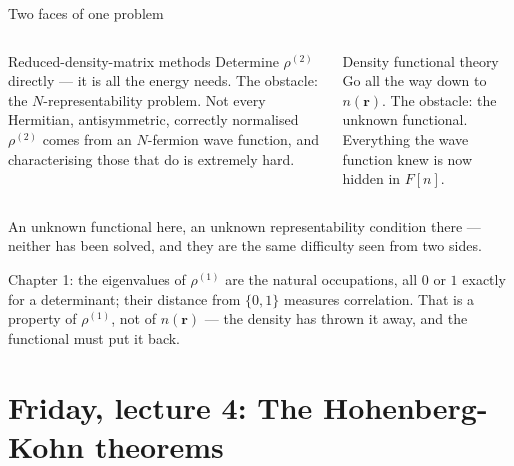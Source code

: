\documentclass[aspectratio=169,10pt]{beamer}
\newcommand{\mbbox}[1]{%
  \begin{tcolorbox}[colback=paleblue,colframe=uioblue,title={\bfseries Many-body connection}]
  #1
  \end{tcolorbox}}
\begin{document}
\begin{frame}[shrink=3]{Two faces of one problem}
  \small
  \begin{columns}[T]
    \begin{block}{Reduced-density-matrix methods}
      Determine $\rho^{(2)}$ directly --- it is all the energy needs. The obstacle: the \alert{$N$-representability problem}. Not every Hermitian, antisymmetric, correctly normalised $\rho^{(2)}$ comes from an $N$-fermion wave function, and characterising those that do is extremely hard.
    \end{block}
    \begin{block}{Density functional theory}
      Go all the way down to $n(\bm r)$. The obstacle: the \alert{unknown functional}. Everything the wave function knew is now hidden in $F[n]$.
    \end{block}
  \end{columns}
  \vspace{0.6em}
  \centering An unknown functional here, an unknown representability condition there --- neither has been solved, and they are the same difficulty seen from two sides.
  \vspace{0.6em}

  \mbbox{Chapter 1: the eigenvalues of $\rho^{(1)}$ are the natural occupations, all $0$ or $1$ exactly for a determinant; their distance from $\{0,1\}$ measures correlation. That is a property of $\rho^{(1)}$, not of $n(\bm r)$ --- the density has thrown it away, and the functional must put it back.}
\end{frame}

\section{Friday, lecture 4: The Hohenberg-Kohn theorems}
\end{document}
